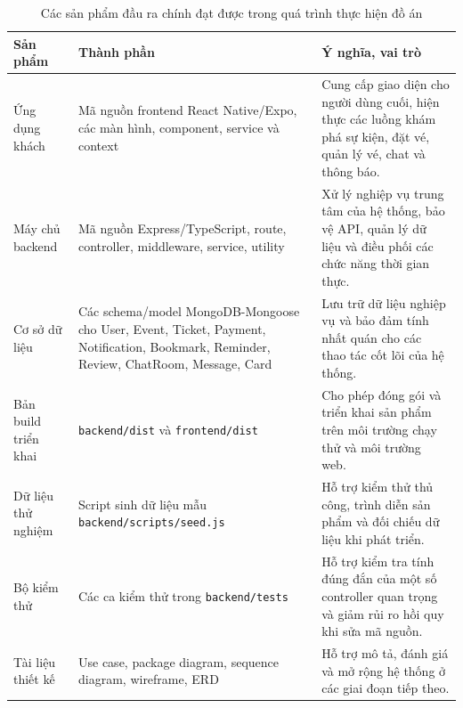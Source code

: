 \documentclass[../DoAn.tex]{subfiles}
\begin{document}
\begin{table}[H]
\centering
\small
\renewcommand{\arraystretch}{1.2}
\begin{tabular}{|p{3.3cm}|p{4.1cm}|p{7.1cm}|}
\hline
\textbf{Sản phẩm} & \textbf{Thành phần} & \textbf{Ý nghĩa, vai trò} \\ \hline
Ứng dụng khách & Mã nguồn frontend React Native/Expo, các màn hình, component, service và context & Cung cấp giao diện cho người dùng cuối, hiện thực các luồng khám phá sự kiện, đặt vé, quản lý vé, chat và thông báo. \\ \hline
Máy chủ backend & Mã nguồn Express/TypeScript, route, controller, middleware, service, utility & Xử lý nghiệp vụ trung tâm của hệ thống, bảo vệ API, quản lý dữ liệu và điều phối các chức năng thời gian thực. \\ \hline
Cơ sở dữ liệu & Các schema/model MongoDB-Mongoose cho User, Event, Ticket, Payment, Notification, Bookmark, Reminder, Review, ChatRoom, Message, Card & Lưu trữ dữ liệu nghiệp vụ và bảo đảm tính nhất quán cho các thao tác cốt lõi của hệ thống. \\ \hline
Bản build triển khai & \texttt{backend/dist} và \texttt{frontend/dist} & Cho phép đóng gói và triển khai sản phẩm trên môi trường chạy thử và môi trường web. \\ \hline
Dữ liệu thử nghiệm & Script sinh dữ liệu mẫu \texttt{backend/scripts/seed.js} & Hỗ trợ kiểm thử thủ công, trình diễn sản phẩm và đối chiếu dữ liệu khi phát triển. \\ \hline
Bộ kiểm thử & Các ca kiểm thử trong \texttt{backend/tests} & Hỗ trợ kiểm tra tính đúng đắn của một số controller quan trọng và giảm rủi ro hồi quy khi sửa mã nguồn. \\ \hline
Tài liệu thiết kế & Use case, package diagram, sequence diagram, wireframe, ERD & Hỗ trợ mô tả, đánh giá và mở rộng hệ thống ở các giai đoạn tiếp theo. \\ \hline
\end{tabular}
\caption{Các sản phẩm đầu ra chính đạt được trong quá trình thực hiện đồ án}
\label{table:result-products}
\end{table}
\end{document}
